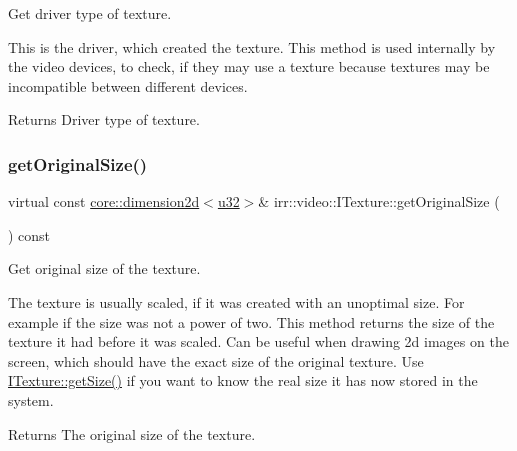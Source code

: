 Get driver type of texture. 

This is the driver, which created the texture. This method is used internally by the video devices, to check, if they may use a texture because textures may be incompatible between different devices. \begin{DoxyReturn}{Returns}
Driver type of texture. 
\end{DoxyReturn}
\mbox{\label{classirr_1_1video_1_1ITexture_adbb05bcee8ec7fa11bb4ccfdb725cda8}} 
\subsubsection{\texorpdfstring{get\+Original\+Size()}{getOriginalSize()}\hspace{0.1cm}{\footnotesize\ttfamily [1/2]}}
{\footnotesize\ttfamily virtual const \hyperlink{classirr_1_1core_1_1dimension2d}{core\+::dimension2d}$<$\hyperlink{namespaceirr_a0416a53257075833e7002efd0a18e804}{u32}$>$\& irr\+::video\+::\+I\+Texture\+::get\+Original\+Size (\begin{DoxyParamCaption}{ }\end{DoxyParamCaption}) const\hspace{0.3cm}{\ttfamily [pure virtual]}}



Get original size of the texture. 

The texture is usually scaled, if it was created with an unoptimal size. For example if the size was not a power of two. This method returns the size of the texture it had before it was scaled. Can be useful when drawing 2d images on the screen, which should have the exact size of the original texture. Use \hyperlink{classirr_1_1video_1_1ITexture_adfcf9558c0f1ae543782c03f7903c48e}{I\+Texture\+::get\+Size()} if you want to know the real size it has now stored in the system. \begin{DoxyReturn}{Returns}
The original size of the texture. 
\end{DoxyReturn}
\mbox{\label{classirr_1_1video_1_1ITexture_adbb05bcee8ec7fa11bb4ccfdb725cda8}} 
